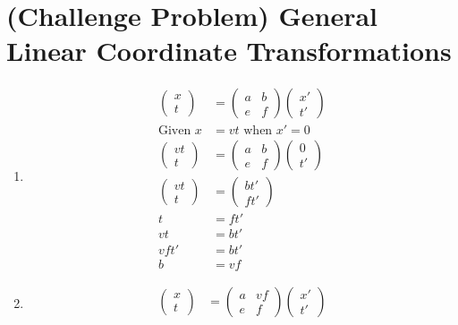 \documentclass[11pt,letterpaper, twocolumn]{article}
\begin{document}
\section{(Challenge Problem) General Linear Coordinate Transformations}
\begin{enumerate}[label=(\alph*)]
    \item \begin{align*}
        \begin{pmatrix}x\\t\end{pmatrix} &= \begin{pmatrix}a&b\\e&f\end{pmatrix}\begin{pmatrix}x'\\t'\end{pmatrix}\\
        \text{Given }x&=vt\text{ when }x'=0\\
        \begin{pmatrix}vt\\t\end{pmatrix} &= \begin{pmatrix}a&b\\e&f\end{pmatrix}\begin{pmatrix}0\\t'\end{pmatrix}\\
        \begin{pmatrix}vt\\t\end{pmatrix} &= \begin{pmatrix}bt'\\ft'\end{pmatrix}\\
        t&=ft'\\
        vt &= bt'\\
        vft'&=bt'\\
        b&=vf
    \end{align*}
    \item \begin{align*}
        \begin{pmatrix}x\\t\end{pmatrix} &= \begin{pmatrix}a&vf\\e&f\end{pmatrix}\begin{pmatrix}x'\\t'\end{pmatrix}\\

\end{align*}
\end{enumerate}
\end{document}

